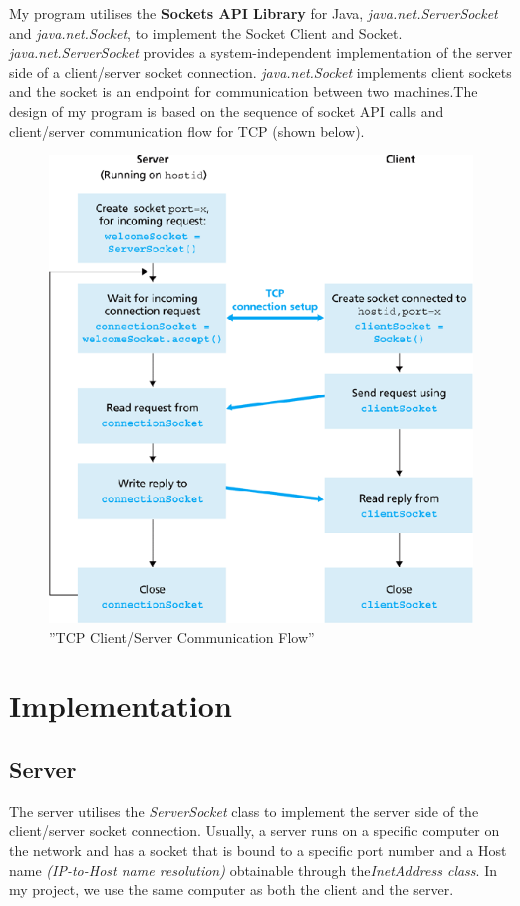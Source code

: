 \documentclass[a4paper,11pt]{article}
\begin{document}
\noindent My program utilises the \textbf{Sockets API Library} for Java, \textit{java.net.ServerSocket} and  \textit{java.net.Socket}, to implement the Socket Client and Socket.\textit{ java.net.ServerSocket} provides a system-independent implementation of the server side of a client/server socket connection.\textit{ java.net.Socket} implements client sockets and the socket is an endpoint for communication between two machines.The design of my program is based on the sequence of socket API calls and client/server communication flow for TCP (shown below).

\begin{figure}[h!]
\begin{center}
\includegraphics[scale=0.5]{socketflow}
\caption{''TCP Client/Server Communication Flow''} 
\end{center}
\end{figure}

\section{Implementation}
\subsection{Server}
The server utilises the \textit{ServerSocket} class to implement the server side of the client/server socket connection.
Usually, a server runs on a specific computer on the network and has a socket that is bound to a specific port number and a Host name \textit{(IP-to-Host name resolution)} obtainable through the\textit{InetAddress class}. In my project, we use the same computer as both the client and the server. 
\end{document}

